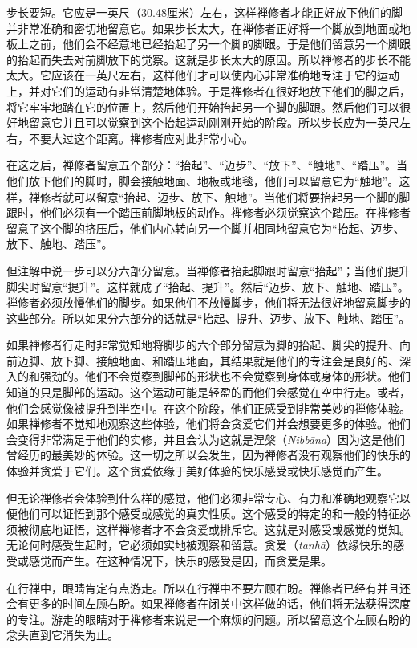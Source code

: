 步长要短。它应是一英尺（30.48厘米）左右，这样禅修者才能正好放下他们的脚并非常准确和密切地留意它。如果步长太大，在禅修者正好将一个脚放到地面或地板上之前，他们会不经意地已经抬起了另一个脚的脚跟。于是他们留意另一个脚跟的抬起而失去对前脚放下的觉察。这就是步长太大的原因。所以禅修者的步长不能太大。它应该在一英尺左右，这样他们才可以使内心非常准确地专注于它的运动上，并对它们的运动有非常清楚地体验。于是禅修者在很好地放下他们的脚之后，将它牢牢地踏在它的位置上，然后他们开始抬起另一个脚的脚跟。然后他们可以很好地留意它并且可以觉察到这个抬起运动刚刚开始的阶段。所以步长应为一英尺左右，不要大过这个距离。禅修者应对此非常小心。

在这之后，禅修者留意五个部分：“抬起”、“迈步”、“放下”、“触地”、“踏压”。当他们\1放下他们的脚时，脚会接触地面、地板或地毯，他们可以留意它为“触地”。这样，禅修者就可以留意“抬起、迈步、放下、触地”。当他们将要抬起另一个脚的脚跟时，他们必须有一个踏压前脚地板的动作。禅修者必须觉察这个踏压。在禅修者留意了这个脚的挤压后，他们内心转向另一个脚并相同地留意它为“抬起、迈步、放下、触地、踏压”。

但注解中说一步可以分六部分留意。当禅修者抬起脚跟时留意“抬起”；当他们提升脚尖时留意“提升”。这样就成了“抬起、提升”。然后“迈步、放下、触地、踏压”。禅修者必须放慢他们的脚步。如果他们不放慢脚步，他们将无法很好地留意脚步的这些部分。所以如果分六部分的话就是“抬起、提升、迈步、放下、触地、踏压”。

如果禅修者行走时非常觉知地将脚步的六个部分留意为脚的抬起、脚尖的提升、向前迈脚、放下脚、接触地面、和踏压地面，其结果就是他们的专注会是良好的、深入的和强劲的。他们不会觉察到脚部的形状也不会觉察到身体或身体的形状。他们知道的只是脚部的运动。这个运动可能是轻盈的而他们会感觉在空中行走。或者，他们会感觉像被提升到半空中。在这个阶段，他们正感受到非常美妙的禅修体验。如果禅修者不觉知地观察这些体验，他们将会贪爱它们并会想要更多的体验。他们会变得非常满足于他们的实修，并且会认为这就是涅槃（{\it Nibb\=ana}）因为这是他们曾经历的最美妙的体验。这一切之所以会发生，因为禅修者没有观察\1他们的快乐的体验并贪爱于它们。这个贪爱依缘于美好体验的快乐感受或快乐感觉而产生。

但无论禅修者会体验到什么样的感觉，他们必须非常专心、有力和准确地观察它以便他们可以证悟到那个感受或感觉的真实性质。这个感受的特定的和一般的特征必须被彻底地证悟，这样禅修者才不会贪爱或排斥它。这就是对感受或感觉的觉知。无论何时感受生起时，它必须如实地被观察和留意。贪爱（{\it tanh\=a}）依缘快乐的感受或感觉而产生。在这种情况下，快乐的感受是因，而贪爱是果。

在行禅中，眼睛肯定有点游走。所以在行禅中不要左顾右盼。禅修者已经有并且还会有更多的时间左顾右盼。如果禅修者在闭关中这样做的话，他们将无法获得深度的专注。游走的眼睛对于禅修者来说是一个麻烦的问题。所以留意这个左顾右盼的念头直到它消失为止。

